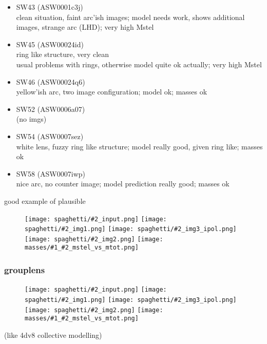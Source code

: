 \documentclass[a4paper,fleqn,usenatbib]{mnras}
\newcommand{\inclfig}[2]{
  \texttt{[image: spaghetti/\#2\_input.png]}
  \texttt{[image: spaghetti/\#2\_img1.png]}
  \texttt{[image: spaghetti/\#2\_img3\_ipol.png]}
  \texttt{[image: spaghetti/\#2\_img2.png]}
  \texttt{[image: masses/\#1\_\#2\_mstel\_vs\_mtot.png]}
}
\begin{document}
\begin{itemize}
  \item SW43 (ASW0001c3j) \\
  clean situation, faint arc'ish images;
  model needs work, shows additional images, strange arc (LHD);
  very high Mstel
  
  \item SW45 (ASW00024id)\\
  ring like structure, very clean \\
  usual problems with rings, otherwise model quite ok actually;
  very high Mstel
  
  \item SW46 (ASW00024q6) \\
  yellow'ish arc, two image configuration;
  model ok;
  masses ok
  
  \item SW52 (ASW0006a07) \\
  (no imgs)
  
  \item SW54 (ASW0007sez) \\
  white lens, fuzzy ring like structure;
  model really good, given ring like;
  masses ok
  
  \item SW58 (ASW0007iwp) \\
  nice arc, no counter image;
  model prediction really good;
  masses ok
  
\end{itemize}

good example of plausible


\begin{figure}
	\inclfig{SW58}{ASW0007iwp_4XBJWT3COV}
\end{figure}


\subsubsection{grouplens}

\begin{figure}
	\inclfig{SW36}{ASW000096t_7IPP7LWVOF}
\end{figure}

(like 4dv8 collective modelling)
\end{document}
